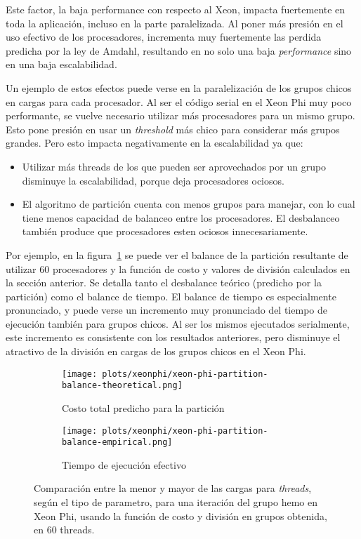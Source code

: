Este factor, la baja performance con respecto al Xeon, impacta fuertemente en toda
la aplicaci\'on, incluso en la parte paralelizada. Al poner m\'as presi\'on en
el uso efectivo de los procesadores, incrementa muy fuertemente las perdida
predicha por la ley de Amdahl, resultando en no solo una baja \textit{performance}
sino en una baja escalabilidad.

Un ejemplo de estos efectos puede verse en la paralelizaci\'on de los grupos chicos
en cargas para cada procesador. Al ser el c\'odigo serial en el Xeon Phi muy poco
performante, se vuelve necesario utilizar m\'as procesadores para un mismo grupo.
Esto pone presi\'on en usar un \textit{threshold} m\'as chico para considerar
m\'as grupos grandes. Pero esto impacta negativamente en la escalabilidad ya que:

\begin{itemize}
    \item Utilizar m\'as threads de los que pueden ser aprovechados por un grupo
    disminuye la escalabilidad, porque deja procesadores ociosos.
    \item El algoritmo de partici\'on cuenta con menos grupos para manejar, con
    lo cual tiene menos capacidad de balanceo entre los procesadores. El
    desbalanceo tambi\'en produce que procesadores esten ociosos innecesariamente.
\end{itemize}

Por ejemplo, en la figura~\ref{fig:partition-balance} se puede ver el balance
de la partici\'on resultante de utilizar 60 procesadores y la funci\'on de costo
y valores de divisi\'on calculados en la secci\'on anterior. Se detalla tanto
el desbalance te\'orico (predicho por la partici\'on) como el balance de tiempo.
El balance de tiempo es especialmente pronunciado, y puede verse un incremento
muy pronunciado del tiempo de ejecuci\'on tambi\'en para grupos chicos. Al ser
los mismos ejecutados serialmente, este incremento es consistente con los
resultados anteriores, pero disminuye el atractivo de la divisi\'on en cargas de
los grupos chicos en el Xeon Phi.

\begin{figure}[htbp]
   \centering
   \begin{subfigure}[b]{\plotwidthtres}
     \texttt{[image: plots/xeonphi/xeon-phi-partition-balance-theoretical.png]}
     \caption{Costo total predicho para la partici\'on}
   \end{subfigure}
   \begin{subfigure}[b]{\plotwidthtres}
       \texttt{[image: plots/xeonphi/xeon-phi-partition-balance-empirical.png]}
     \caption{Tiempo de ejecuci\'on efectivo}
   \end{subfigure}
   \caption{Comparaci\'on entre la menor y mayor de las cargas para \textit{threads},
   seg\'un el tipo de parametro, para una iteraci\'on del grupo hemo en Xeon Phi, usando
   la funci\'on de costo y divisi\'on en grupos obtenida, en 60 threads.}
   \label{fig:partition-balance}
\end{figure}

